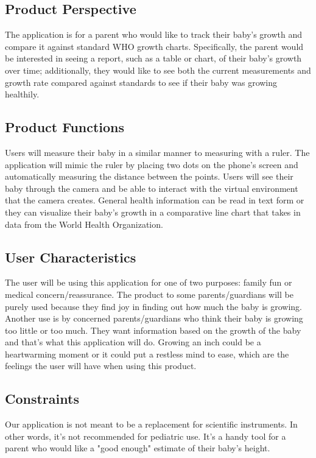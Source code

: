 \documentclass[letterpaper,10pt,draftclsnofoot,onecolumn,compsoc]{IEEEtran}
\begin{document}
\subsection{Product Perspective}
\begin{singlespace}
\noindent
    The application is for a parent who would like to track their baby's growth and compare it against standard WHO growth charts. Specifically, the parent would be interested in seeing a report, such as a  table or chart, of their baby's growth over time; additionally, they would like to see both the current measurements and growth rate compared against standards to see if their baby was growing healthily.
\end{singlespace}

\subsection{Product Functions}
\begin{singlespace}
\noindent
Users will measure their baby in a similar manner to measuring with a ruler. The application will mimic the ruler by placing two dots on the phone's screen and automatically measuring the distance between the points. Users will see their baby through the camera and be able to interact with the virtual environment that the camera creates. General health information can be read in text form or they can visualize their baby's growth in a comparative line chart that takes in data from the World Health Organization.
\end{singlespace}

\subsection{User Characteristics}
\begin{singlespace}
\noindent
The user will be using this application for one of two purposes: family fun or medical concern/reassurance. The product to some parents/guardians will be purely used because they find joy in finding out how much the baby is growing. Another use is by concerned parents/guardians who think their baby is growing too little or too much. They want information based on the growth of the baby and that's what this application will do. Growing an inch could be a heartwarming moment or it could put a restless mind to ease, which are the feelings the user will have when using this product.
\end{singlespace}

\subsection{Constraints}
\begin{singlespace}
\noindent
Our application is not meant to be a replacement for scientific instruments. In other words, it's not recommended for pediatric use. It's a handy tool for a parent who would like a "good enough" estimate of their baby's height.
\end{singlespace}
\end{document}
